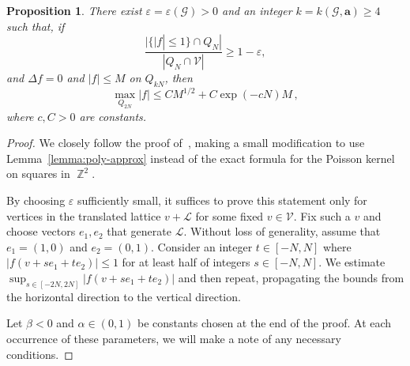 \documentclass{daj}
\newtheorem{prop}[theorem]{Proposition}
\newcommand{\G}{\mathcal{G}}
\newcommand{\V}{\mathcal{V}}
\newcommand{\cond}{\mathbf{a}}
\newcommand{\eps}{\varepsilon}
\DeclareMathOperator{\Z}{\mathbb{Z}}
\begin{document}
\begin{prop}
	\label{prop:three-ball}
	There exist $\eps = \eps(\G) > 0$ and an integer $k = k(\G, \cond) \geq 4$ such that, if
	\begin{equation*}
		\frac{|\{|f| \leq 1\} \cap Q_N|}{|Q_N \cap \V|} \geq 1-\eps,
	\end{equation*}
	and $\Delta f = 0$ and $|f| \leq M$ on $Q_{kN}$, then
	\begin{equation}
		\label{eq:three-ball-statement}
		\max_{Q_{2N}} |f| \leq CM^{1/2} + C\exp(-cN)M \, ,
	\end{equation}
	where $c, C > 0$ are constants.
\end{prop}
\begin{proof}
	We closely follow the proof of~\cite[Theorem~3.1]{buhovsky2022discrete}, making a small modification to use Lemma~\ref{lemma:poly-approx} instead of the exact formula for the Poisson kernel on squares in $\Z^2$.
	
	By choosing $\eps$ sufficiently small, it suffices to prove this statement only for vertices in the translated lattice $v + \mathcal{L}$ for some fixed $v \in \V$. Fix such a $v$ and choose vectors $e_1, e_2$ that generate $\mathcal{L}$. Without loss of generality, assume that $e_1 = (1, 0)$ and $e_2 = (0, 1)$. Consider an integer $t \in [-N, N]$ where $|f(v + se_1 + te_2)| \leq 1$ for at least half of integers $s \in [-N, N]$. We estimate $\sup_{s \in [-2N, 2N]} |f(v + se_1 + te_2)|$ and then repeat, propagating the bounds from the horizontal direction to the vertical direction.
	
	Let $\beta < 0$ and $\alpha \in (0, 1)$ be constants chosen at the end of the proof. At each occurrence of these parameters, we will make a note of any necessary conditions.
	

\end{proof}
\end{document}
